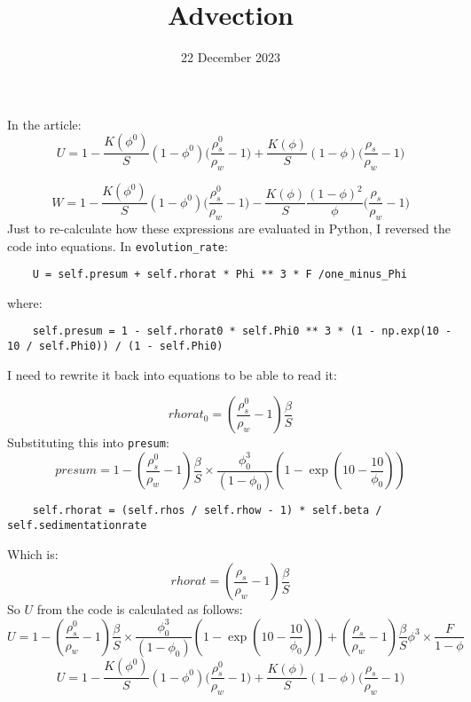 \documentclass[11pt, letterpaper]{article}
\title{Advection}
\date{22 December 2023}
\begin{document}
\maketitle

In the article:
\begin{equation}
    U = 1 - \frac{K(\phi^0)}{S}(1-\phi^0)\big(\frac{\rho_s^0}{\rho_w} - 1 \big) + \frac{K(\phi)}{S}(1-\phi) \big(\frac{\rho_s}{\rho_w}-1\big)
\end{equation}

\begin{equation}
    W = 1 - \frac{K(\phi^0)}{S}(1-\phi^0) \big(\frac{\rho_s^0}{\rho_w}-1) - \frac{K(\phi)}{S} \frac{(1-\phi)^2}{\phi}\big(\frac{\rho_s}{\rho_w}-1\big)
\end{equation}
Just to re-calculate how these expressions are evaluated in Python, I reversed the code into equations.
In \verb|evolution_rate|:
\begin{verbatim}
    U = self.presum + self.rhorat * Phi ** 3 * F /one_minus_Phi
\end{verbatim}
where:
\begin{verbatim}
    self.presum = 1 - self.rhorat0 * self.Phi0 ** 3 * (1 - np.exp(10 - 10 / self.Phi0)) / (1 - self.Phi0)     
\end{verbatim}

I need to rewrite it back into equations to be able to read it:

\begin{equation}
    rhorat_0 = (\frac{\rho_s^0}{\rho_w} - 1) \frac{\beta}{S}
\end{equation}
Substituting this into \verb|presum|:
\begin{equation}
    presum = 1 - (\frac{\rho_s^0}{\rho_w} - 1) \frac{\beta}{S} \times \frac{\phi_0^3}{(1 - \phi_0)} \left(1 - \exp\left(10 - \frac{10}{\phi_0} \right) \right)  
\end{equation}
\begin{verbatim}
    self.rhorat = (self.rhos / self.rhow - 1) * self.beta / self.sedimentationrate
\end{verbatim}
Which is:
\begin{equation}
    rhorat = (\frac{\rho_s}{\rho_w} - 1)\frac{\beta}{S}
\end{equation}
So $U$ from the code is calculated as follows:
\begin{equation}
    U = 1 - (\frac{\rho_s^0}{\rho_w} - 1) \frac{\beta}{S} \times \frac{\phi_0^3}{(1 - \phi_0)} \left(1 - \exp\left(10 - \frac{10}{\phi_0} \right) \right) + (\frac{\rho_s}{\rho_w} - 1)\frac{\beta}{S} \phi^3\times\frac{F}{1-\phi}
\end{equation}
\begin{equation}
    U = 1 - \frac{K(\phi^0)}{S}(1-\phi^0)\big(\frac{\rho_s^0}{\rho_w} - 1 \big) + \frac{K(\phi)}{S}(1-\phi) \big(\frac{\rho_s}{\rho_w}-1\big)
\end{equation}
\end{document}
